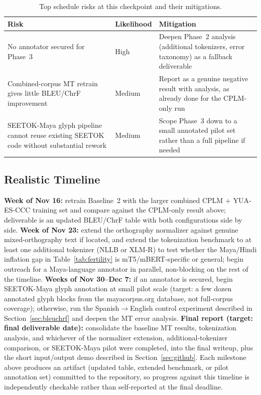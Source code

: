 \documentclass[11pt]{article}
\begin{document}
\begin{table}[h]
\centering
\small
\setlength{\tabcolsep}{3pt}
\begin{tabular}{p{2.3cm}p{2.0cm}p{2.5cm}}
\toprule
\textbf{Risk} & \textbf{Likelihood} & \textbf{Mitigation} \\
\midrule
No annotator secured for Phase~3 & High & Deepen Phase~2 analysis
  (additional tokenizers, error taxonomy) as a fallback deliverable \\
Combined-corpus MT retrain gives little BLEU/ChrF improvement & Medium &
  Report as a genuine negative result with analysis, as already done for
  the CPLM-only run \\
SEETOK-Maya glyph pipeline cannot reuse existing SEETOK code without
  substantial rework & Medium & Scope Phase~3 down to a small annotated
  pilot set rather than a full pipeline if needed \\
\bottomrule
\end{tabular}
\caption{Top schedule risks at this checkpoint and their mitigations.}
\label{tab:risks}
\end{table}

\subsection{Realistic Timeline}

\textbf{Week of Nov 16:} retrain Baseline~2 with the larger combined CPLM +
YUA-ES-CCC training set and compare against the CPLM-only result above;
deliverable is an updated BLEU/ChrF table with both configurations side by
side. \textbf{Week of Nov 23:} extend the orthography normalizer against
genuine mixed-orthography text if located, and extend the tokenization
benchmark to at least one additional tokenizer (NLLB or XLM-R) to test
whether the Maya/Hindi inflation gap in Table~\ref{tab:fertility} is
mT5/mBERT-specific or general; begin outreach for a Maya-language annotator
in parallel, non-blocking on the rest of the timeline. \textbf{Weeks of
Nov 30--Dec 7:} if an annotator is secured, begin SEETOK-Maya glyph
annotation at small pilot scale (target: a few dozen annotated glyph
blocks from the mayacorpus.org database, not full-corpus coverage);
otherwise, run the Spanish$\to$English control experiment described in
Section~\ref{sec:bleuchrf} and deepen the MT error analysis. \textbf{Final
report (target: final deliverable date):} consolidate the baseline MT
results, tokenization analysis, and whichever of the normalizer extension,
additional-tokenizer comparison, or SEETOK-Maya pilot were completed, into
the final writeup, plus the short input/output demo described in
Section~\ref{sec:github}. Each milestone above produces an artifact
(updated table, extended benchmark, or pilot annotation set) committed to
the repository, so progress against this timeline is independently
checkable rather than self-reported at the final deadline.
\end{document}
